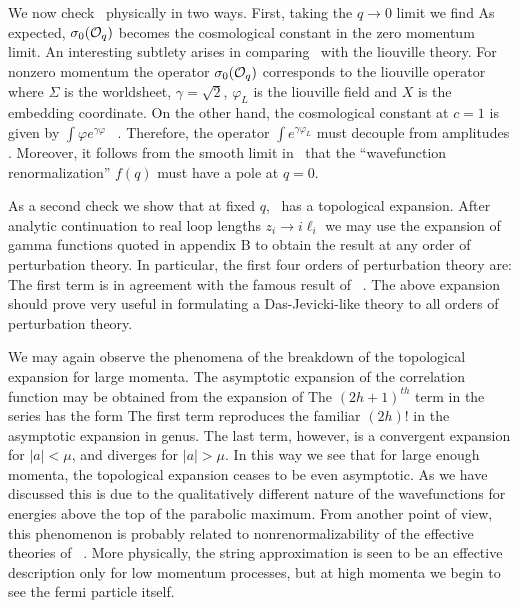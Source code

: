 We now check \twptii\  physically
in two ways. First, taking the $q\to 0$ limit we find
\eqn{}
As expected, $\sigma_0({\cal O}_q)$
becomes the  cosmological constant in the zero momentum limit.
An interesting subtlety arises in comparing
\quezer\ with the liouville theory. 
For nonzero momentum the operator $\sigma_0({\cal O}_q)$ corresponds to the 
liouville operator
\eqn{}
where $\Sigma$ is the worldsheet, $\gamma=\sqrt{2}$, $\varphi_L$
is the liouville field and $X$ is the embedding coordinate. 
On the other hand, the cosmological constant at $c=1$ is 
given by $\int \varphi e^{\gamma\varphi}$
\JOE\natiliouv\ . Therefore, the operator $\int e^{\gamma\varphi_L}$
must decouple from amplitudes
. 
Moreover, it follows from the smooth 
limit in \quezer\ that the ``wavefunction renormalization''
$f(q)$ must have a pole at $q=0$.

As a second check we show that
at fixed $q$, \twptii\ has a topological expansion. 
After analytic continuation to real loop lengths 
$z_i\to i \ell_i$ we may use the expansion of 
gamma functions quoted in appendix B to obtain the 
result at any order of perturbation theory. 
In particular, the first four orders of perturbation 
theory are:
\eqn{}
The first term is 
in agreement with the famous result of \kostov\ .
The above expansion should prove very useful in 
formulating a Das-Jevicki-like theory to all orders
of perturbation theory. 

We may again observe the phenomena of the breakdown 
of the topological expansion for large momenta.
The asymptotic expansion of the correlation function may 
be obtained from the expansion of 
\eqn{}
The $(2h+1)^{th}$ term in the series has the form
\eqn{}
The first term reproduces the familiar $(2h)!$ in the asymptotic
expansion in genus. The last term, however, is a 
convergent expansion for $|a|<\mu$, and diverges for $|a|>\mu$. 
In this way we see that for large enough momenta, the 
topological expansion ceases to be even asymptotic. As we 
have discussed this is due to the qualitatively 
different nature of the 
wavefunctions for energies above the top of the parabolic 
maximum. From another point of view, 
this phenomenon is probably related to nonrenormalizability
of the effective theories of \JOE\dsjv\senwad\gk\ .
More physically, the string approximation is seen 
to be an effective description only for low momentum processes, but at
high momenta we begin to see the fermi particle itself. 

